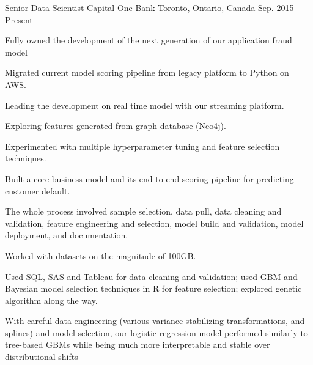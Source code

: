 

\begin{cventries}

  \cventry
    {Senior Data Scientist} %
    {Capital One Bank} %
    {Toronto, Ontario, Canada} %
    {Sep. 2015 - Present} %
    {
      \begin{cvitems} %
        \item {Fully owned the development of the next generation of our application fraud model}\\
        \begin{cvitems}
          \item {Migrated current model scoring pipeline from legacy platform to Python on AWS.}
          \item {Leading the development on real time model with our streaming platform.}
          \item {Exploring features generated from graph database (Neo4j).}
          \item {Experimented with multiple hyperparameter tuning and feature selection techniques.}\\
        \end{cvitems}
        \item {Built a core business model and its end-to-end scoring pipeline for predicting customer default.}\\
        \begin{cvitems}
          \item {The whole process involved sample selection, data pull, data cleaning and validation, feature engineering and selection, model build and validation, model deployment, and documentation.}
          \item {Worked with datasets on the magnitude of 100GB.}
          \item {Used SQL, SAS and Tableau for data cleaning and validation; used GBM and Bayesian model selection techniques in R for feature selection; explored genetic algorithm along the way.}
          \item {With careful data engineering (various variance stabilizing transformations, and splines) and model selection, our logistic regression model performed similarly to tree-based GBMs while being much more interpretable and stable over distributional shifts}

\end{cvitems}
\end{cvitems}}
\end{cventries}

